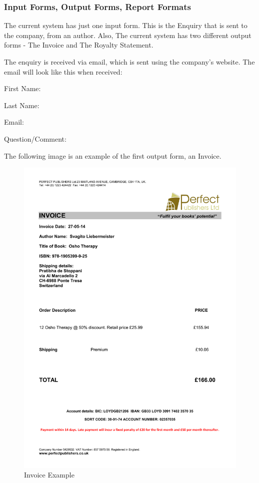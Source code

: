 \subsubsection{Input Forms, Output Forms, Report Formats}

The current system has just one input form. This is the Enquiry that is sent to the company, from an author. Also, The current system has two different output forms - The Invoice and The Royalty Statement.


The enquiry is received via email, which is sent using the company's website. The email will look like this when received:


First Name:

Last Name:

Email:

Question/Comment:



The following image is an example of the first output form, an Invoice.

\begin{figure}[H]
    \includegraphics[width=\textwidth]{./Analysis/Invoice_Example.pdf}
    \caption{Invoice Example} \label{Invoice_Example.pdf}
\end{figure}


